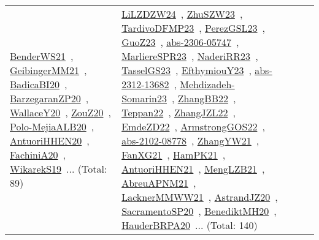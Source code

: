 {\begin{longtable}{lp{3cm}>{\raggedright\arraybackslash}p{6cm}>{\raggedright\arraybackslash}p{6cm}>{\raggedright\arraybackslash}p{8cm}}
\href{../works/BenderWS21.pdf}{BenderWS21}~\cite{BenderWS21}, \href{../works/GeibingerMM21.pdf}{GeibingerMM21}~\cite{GeibingerMM21}, \href{../works/BadicaBI20.pdf}{BadicaBI20}~\cite{BadicaBI20}, \href{../works/BarzegaranZP20.pdf}{BarzegaranZP20}~\cite{BarzegaranZP20}, \href{../works/WallaceY20.pdf}{WallaceY20}~\cite{WallaceY20}, \href{../works/ZouZ20.pdf}{ZouZ20}~\cite{ZouZ20}, \href{../works/Polo-MejiaALB20.pdf}{Polo-MejiaALB20}~\cite{Polo-MejiaALB20}, \href{../works/AntuoriHHEN20.pdf}{AntuoriHHEN20}~\cite{AntuoriHHEN20}, \href{../works/FachiniA20.pdf}{FachiniA20}~\cite{FachiniA20}, \href{../works/WikarekS19.pdf}{WikarekS19}~\cite{WikarekS19}... (Total: 89) & \href{../works/LiLZDZW24.pdf}{LiLZDZW24}~\cite{LiLZDZW24}, \href{../works/ZhuSZW23.pdf}{ZhuSZW23}~\cite{ZhuSZW23}, \href{../works/TardivoDFMP23.pdf}{TardivoDFMP23}~\cite{TardivoDFMP23}, \href{../works/PerezGSL23.pdf}{PerezGSL23}~\cite{PerezGSL23}, \href{../works/GuoZ23.pdf}{GuoZ23}~\cite{GuoZ23}, \href{../works/abs-2306-05747.pdf}{abs-2306-05747}~\cite{abs-2306-05747}, \href{../works/MarliereSPR23.pdf}{MarliereSPR23}~\cite{MarliereSPR23}, \href{../works/NaderiRR23.pdf}{NaderiRR23}~\cite{NaderiRR23}, \href{../works/TasselGS23.pdf}{TasselGS23}~\cite{TasselGS23}, \href{../works/EfthymiouY23.pdf}{EfthymiouY23}~\cite{EfthymiouY23}, \href{../works/abs-2312-13682.pdf}{abs-2312-13682}~\cite{abs-2312-13682}, \href{../works/Mehdizadeh-Somarin23.pdf}{Mehdizadeh-Somarin23}~\cite{Mehdizadeh-Somarin23}, \href{../works/ZhangBB22.pdf}{ZhangBB22}~\cite{ZhangBB22}, \href{../works/Teppan22.pdf}{Teppan22}~\cite{Teppan22}, \href{../works/ZhangJZL22.pdf}{ZhangJZL22}~\cite{ZhangJZL22}, \href{../works/EmdeZD22.pdf}{EmdeZD22}~\cite{EmdeZD22}, \href{../works/ArmstrongGOS22.pdf}{ArmstrongGOS22}~\cite{ArmstrongGOS22}, \href{../works/abs-2102-08778.pdf}{abs-2102-08778}~\cite{abs-2102-08778}, \href{../works/ZhangYW21.pdf}{ZhangYW21}~\cite{ZhangYW21}, \href{../works/FanXG21.pdf}{FanXG21}~\cite{FanXG21}, \href{../works/HamPK21.pdf}{HamPK21}~\cite{HamPK21}, \href{../works/AntuoriHHEN21.pdf}{AntuoriHHEN21}~\cite{AntuoriHHEN21}, \href{../works/MengLZB21.pdf}{MengLZB21}~\cite{MengLZB21}, \href{../works/AbreuAPNM21.pdf}{AbreuAPNM21}~\cite{AbreuAPNM21}, \href{../works/LacknerMMWW21.pdf}{LacknerMMWW21}~\cite{LacknerMMWW21}, \href{../works/AstrandJZ20.pdf}{AstrandJZ20}~\cite{AstrandJZ20}, \href{../works/SacramentoSP20.pdf}{SacramentoSP20}~\cite{SacramentoSP20}, \href{../works/BenediktMH20.pdf}{BenediktMH20}~\cite{BenediktMH20}, \href{../works/HauderBRPA20.pdf}{HauderBRPA20}~\cite{HauderBRPA20}... (Total: 140)\\

\end{longtable}}
